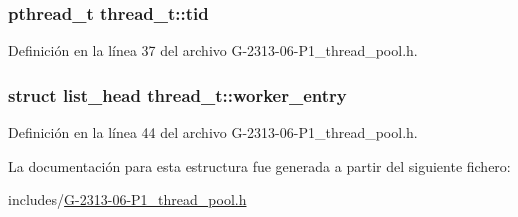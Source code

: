\hypertarget{structthread__t_a92c076d58ca307499452b8dfe0c4e598}{}
\subsubsection[{tid}]{\setlength{\rightskip}{0pt plus 5cm}pthread\+\_\+t thread\+\_\+t\+::tid}\label{structthread__t_a92c076d58ca307499452b8dfe0c4e598}


Definición en la línea 37 del archivo G-\/2313-\/06-\/\+P1\+\_\+thread\+\_\+pool.\+h.

\hypertarget{structthread__t_a03432229de426c5ba35d0dfa325491f0}{}
\subsubsection[{worker\+\_\+entry}]{\setlength{\rightskip}{0pt plus 5cm}struct {\bf list\+\_\+head} thread\+\_\+t\+::worker\+\_\+entry}\label{structthread__t_a03432229de426c5ba35d0dfa325491f0}


Definición en la línea 44 del archivo G-\/2313-\/06-\/\+P1\+\_\+thread\+\_\+pool.\+h.



La documentación para esta estructura fue generada a partir del siguiente fichero\+:\begin{DoxyCompactItemize}
\item 
includes/\hyperlink{G-2313-06-P1__thread__pool_8h}{G-\/2313-\/06-\/\+P1\+\_\+thread\+\_\+pool.\+h}\end{DoxyCompactItemize}
